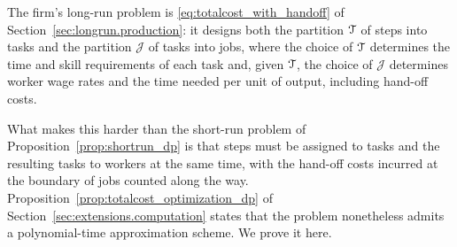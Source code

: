 The firm's long-run problem is \eqref{eq:totalcost_with_handoff} of Section~\ref{sec:longrun.production}: it designs both the partition $\mathcal{T}$ of steps into tasks and the partition $\mathcal{J}$ of tasks into jobs, where the choice of $\mathcal{T}$ determines the time and skill requirements of each task and, given $\mathcal{T}$, the choice of $\mathcal{J}$ determines worker wage rates and the time needed per unit of output, including hand-off costs.

What makes this harder than the short-run problem of Proposition~\ref{prop:shortrun_dp} is that steps must be assigned to tasks and the resulting tasks to workers at the same time, with the hand-off costs incurred at the boundary of jobs counted along the way.
Proposition~\ref{prop:totalcost_optimization_dp} of Section~\ref{sec:extensions.computation} states that the problem nonetheless admits a polynomial-time approximation scheme.
We prove it here.

